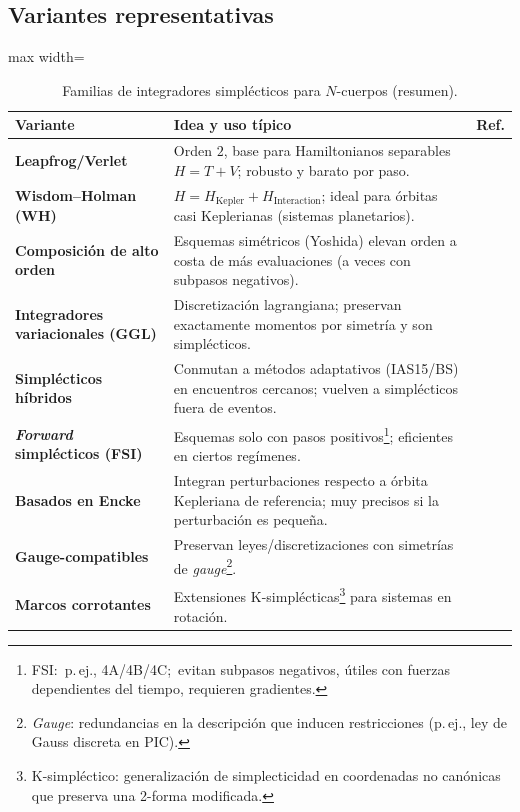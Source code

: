 \subsection{Variantes representativas}
\begin{table}[htbp]
  \centering
  \caption{Familias de integradores simplécticos para $N$-cuerpos (resumen).}%
  \label{tab:integrator_variants}
  \begin{adjustbox}{max width=\textwidth}
  \begin{tabular}{>{\bfseries}l|p{}|c} %
    \toprule
    Variante & Idea y uso típico & Ref. \\
    \midrule
    Leapfrog/Verlet & Orden $2$, base para Hamiltonianos separables $H=T+V$; robusto y barato por paso. &~\cite{stuchi2002, farr2007, Hernandez2015}\\
    \midrule
    Wisdom–Holman (WH) & $H=H_{\text{Kepler}}+H_{\text{Interaction}}$; ideal para órbitas casi Keplerianas (sistemas planetarios). &~\cite{wisdom1991, yoshida1990, rebound_doc}\\
    \midrule
    Composición de alto orden & Esquemas simétricos (Yoshida) elevan orden a costa de más evaluaciones (a veces con subpasos negativos). &~\cite{farr2007, yoshida1993}\\
    \midrule
    Integradores variacionales (GGL) & Discretización lagrangiana; preservan exactamente momentos por simetría y son simplécticos. &~\cite{farr2007, Hernandez2015}\\
    \midrule
    Simplécticos híbridos & Conmutan a métodos adaptativos (IAS15/BS) en encuentros cercanos; vuelven a simplécticos fuera de eventos. &~\cite{hernandez2020, rebound_doc, rein2019}\\
    \midrule
    \emph{Forward} simplécticos (FSI) & Esquemas solo con pasos positivos\footnote{%
    FSI:\ p.\,ej., 4A/4B/4C;\ evitan subpasos negativos, útiles con fuerzas dependientes del tiempo, requieren gradientes.}; eficientes en ciertos regímenes. &~\cite{chin2005}\\
    \midrule
    Basados en Encke & Integran perturbaciones respecto a órbita Kepleriana de referencia; muy precisos si la perturbación es pequeña. &~\cite{hernandez2020}\\
    \midrule
    Gauge-compatibles & Preservan leyes/discretizaciones con simetrías de \emph{gauge}\footnote{%
    \emph{Gauge}: redundancias en la descripción que inducen restricciones (p.\,ej., ley de Gauss discreta en PIC).}. &~\cite{glasser2022}\\
    \midrule
    Marcos corrotantes & Extensiones K-simplécticas\footnote{%
    K-simpléctico: generalización de simplecticidad en coordenadas no canónicas que preserva una 2-forma modificada.} para sistemas en rotación. &~\cite{tu2019}\\
    \bottomrule
  \end{tabular}
  \end{adjustbox}
\end{table}

